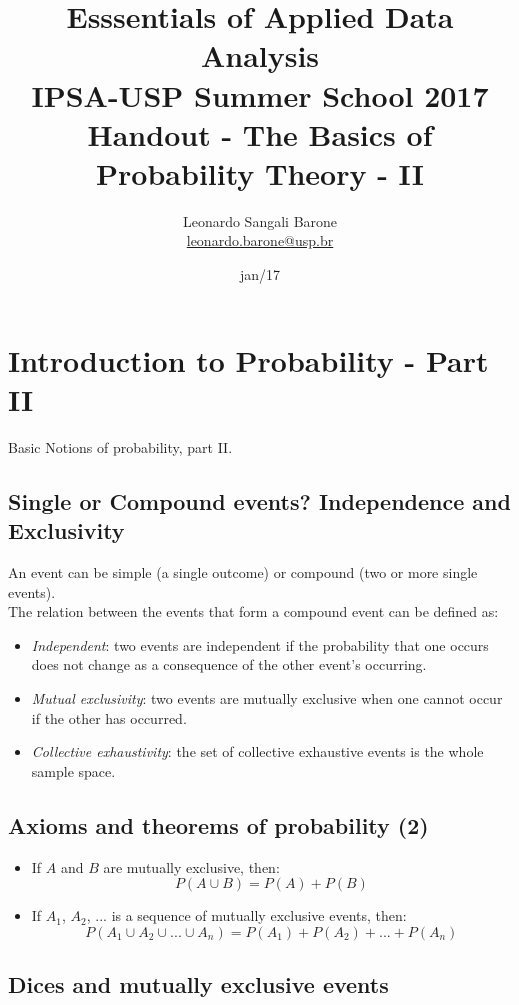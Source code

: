 \documentclass[11pt]{article}
\title{\textbf{Esssentials of Applied Data Analysis\\
				IPSA-USP Summer School 2017}\newline\\
				Handout - The Basics of Probability Theory - II}
\author{Leonardo Sangali Barone\\ \href{leonardo.barone@usp.br}{leonardo.barone@usp.br}}
\date{jan/17}
\begin{document}
\maketitle

\section*{Introduction to Probability - Part II}

	Basic Notions of probability, part II.

	\subsection*{Single or Compound events? Independence and Exclusivity}

	An event can be simple (a single outcome) or compound (two or more single events).\\

	The relation between the events that form a compound event can be defined as:
	
	\begin{itemize}
		\item \emph{Independent}: two events are independent if the probability that one occurs does not change as a consequence of the other event’s occurring.
		\item \emph{Mutual exclusivity}: two events are mutually exclusive when one cannot occur if the  other has occurred.
		\item \emph{Collective exhaustivity}: the set of collective exhaustive events is the whole sample space.
	\end {itemize}


	\subsection*{Axioms and theorems of probability (2)}
	\begin{itemize}
		\item  If $A$ and $B$ are mutually exclusive, then:
	\[P(A \cup B) = P(A) + P (B)\]
		\item  If $A_1$, $A_2$, ... is a sequence of mutually exclusive events, then:
	\[P(A_1 \cup A_2 \cup ... \cup A_n) = P(A_1) + P (A_2) + ... + P(A_n)\]
	\end{itemize}


	\subsection*{Dices and mutually exclusive events}
\end{document}
